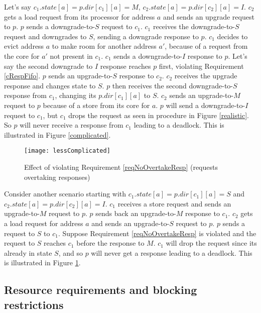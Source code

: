 Let's say $c_1.state[a] = p.dir[c_1][a] = M$, $c_2.state[a] = p.dir[c_2][a] =
I$. $c_2$ gets a load request from its processor for address $a$ and sends an
upgrade request to $p$. $p$ sends a downgrade-to-$S$ request to $c_1$. $c_1$
receives the downgrade-to-$S$ request and downgrades to $S$, sending a downgrade
response to $p$. $c_1$ decides to evict address $a$ to make room for another
address $a'$, because of a request from the core for $a'$ not present in $c_1$.
$c_1$ sends a downgrade-to-$I$ response to $p$. Let's say the second downgrade
to $I$ response reaches $p$ first, violating Requirement \ref{cRespFifo}. $p$
sends an upgrade-to-$S$ response to $c_2$. $c_2$ receives the upgrade response
and changes state to $S$. $p$ then receives the second downgrade-to-$S$ response
from $c_1$, changing its $p.dir[c_1][a]$ to $S$. $c_2$ sends an upgrade-to-$M$
request to $p$ because of a store from its core for $a$. $p$ will send a
downgrade-to-$I$ request to $c_1$, but $c_1$ drops the request as seen in
procedure \dReq{} in Figure \ref{realistic}. So $p$ will never receive a
response from $c_1$ leading to a deadlock. This is illustrated in Figure
\ref{complicated}.

\begin{figure}
\centering
\texttt{[image: lessComplicated]}
\caption{Effect of violating Requirement \ref{reqNoOvertakeResp} (requests overtaking responses)}
\label{lessComplicated}
\end{figure}

Consider another scenario starting with $c_1.state[a] = p.dir[c_1][a] = S$ and
$c_2.state[a] = p.dir[c_2][a] = I$. $c_1$ receives a store request and sends an
upgrade-to-$M$ request to $p$. $p$ sends back an upgrade-to-$M$ response to
$c_1$. $c_2$ gets a load request for address $a$ and sends an upgrade-to-$S$
request to $p$. $p$ sends a request to $S$ to $c_1$. Suppose Requirement
\ref{reqNoOvertakeResp} is violated and the request to $S$ reaches $c_1$ before
the response to $M$. $c_1$ will drop the request since its already in state $S$,
and so $p$ will never get a response leading to a deadlock. This is illustrated
in Figure \ref{lessComplicated}.

\subsection{Resource requirements and blocking restrictions}

